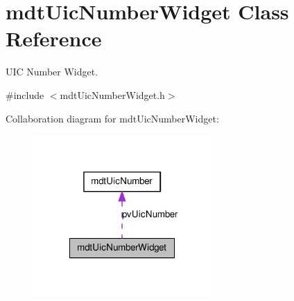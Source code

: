 \hypertarget{classmdt_uic_number_widget}{
\section{mdtUicNumberWidget Class Reference}
\label{classmdt_uic_number_widget}
}


UIC Number Widget.  




{\ttfamily \#include $<$mdtUicNumberWidget.h$>$}



Collaboration diagram for mdtUicNumberWidget:\nopagebreak
\begin{figure}[H]
\begin{center}
\leavevmode
\includegraphics[width=197pt]{classmdt_uic_number_widget__coll__graph}
\end{center}
\end{figure}
